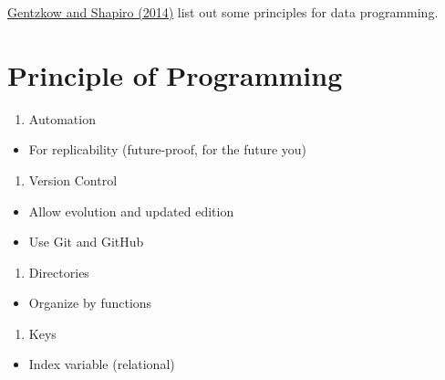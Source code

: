 \documentclass[]{book}
\providecommand{\tightlist}{%
  \setlength{\itemsep}{0pt}\setlength{\parskip}{0pt}}
\begin{document}
\href{http://home.bi.no/charlotte.ostergaard/students/CodeAndData.pdf}{Gentzkow and Shapiro (2014)} list out some principles for data programming.

\hypertarget{principle-of-programming}{%
\section{Principle of Programming}\label{principle-of-programming}}

\begin{enumerate}
\def\labelenumi{\arabic{enumi}.}
\tightlist
\item
  Automation
\end{enumerate}

\begin{itemize}
\tightlist
\item
  For replicability (future-proof, for the future you)
\end{itemize}

\begin{enumerate}
\def\labelenumi{\arabic{enumi}.}
\setcounter{enumi}{1}
\tightlist
\item
  Version Control
\end{enumerate}

\begin{itemize}
\tightlist
\item
  Allow evolution and updated edition
\item
  Use Git and GitHub
\end{itemize}

\begin{enumerate}
\def\labelenumi{\arabic{enumi}.}
\setcounter{enumi}{2}
\tightlist
\item
  Directories
\end{enumerate}

\begin{itemize}
\tightlist
\item
  Organize by functions
\end{itemize}

\begin{enumerate}
\def\labelenumi{\arabic{enumi}.}
\setcounter{enumi}{3}
\tightlist
\item
  Keys
\end{enumerate}

\begin{itemize}
\tightlist
\item
  Index variable (relational)
\end{itemize}
\end{document}
